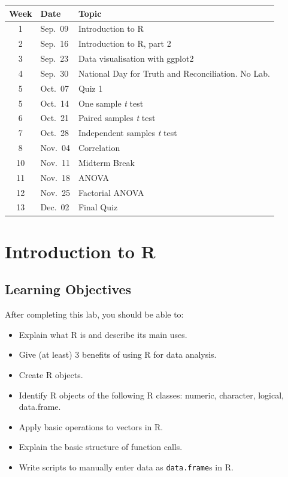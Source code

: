 \documentclass[
]{book}
\providecommand{\tightlist}{%
  \setlength{\itemsep}{0pt}\setlength{\parskip}{0pt}}
\begin{document}
\begin{longtable}[]{@{}cll@{}}
\toprule
Week & Date & Topic \\
\midrule
\endhead
1 & Sep.~09 & Introduction to R \\
2 & Sep.~16 & Introduction to R, part 2 \\
3 & Sep.~23 & Data visualisation with ggplot2 \\
4 & Sep.~30 & National Day for Truth and Reconciliation. No Lab. \\
5 & Oct.~07 & Quiz 1 \\
5 & Oct.~14 & One sample \emph{t} test \\
6 & Oct.~21 & Paired samples \emph{t} test \\
7 & Oct.~28 & Independent samples \emph{t} test \\
8 & Nov.~04 & Correlation \\
10 & Nov.~11 & Midterm Break \\
11 & Nov.~18 & ANOVA \\
12 & Nov.~25 & Factorial ANOVA \\
13 & Dec.~02 & Final Quiz \\
\bottomrule
\end{longtable}

\hypertarget{intro1}{%
\chapter{Introduction to R}\label{intro1}}

\hypertarget{learning-objectives}{%
\section{Learning Objectives}\label{learning-objectives}}

After completing this lab, you should be able to:

\begin{itemize}
\tightlist
\item
  Explain what R is and describe its main uses.
\item
  Give (at least) 3 benefits of using R for data analysis.
\item
  Create R objects.
\item
  Identify R objects of the following R classes: numeric, character, logical, data.frame.
\item
  Apply basic operations to vectors in R.
\item
  Explain the basic structure of function calls.
\item
  Write scripts to manually enter data as \texttt{data.frame}s in R.
\end{itemize}
\end{document}
